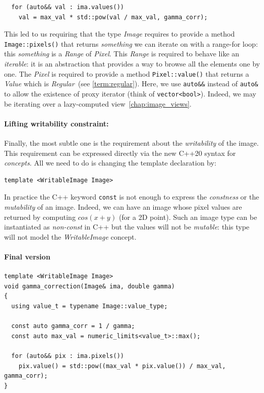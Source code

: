 \begin{verbatim}
  for (auto&& val : ima.values())
    val = max_val * std::pow(val / max_val, gamma_corr);
\end{verbatim}

\noindent This led to us requiring that the type \emph{Image} requires to provide a method \texttt{Image::pixels()} that
returns \emph{something} we can iterate on with a range-for loop: this \emph{something} is a \emph{Range} of
\emph{Pixel}. This \emph{Range} is required to behave like an \emph{iterable}: it is an abstraction that provides a way
to browse all the elements one by one. The \emph{Pixel} is required to provide a method \texttt{Pixel::value()} that
returns a \emph{Value} which is \emph{Regular}~(see \cref{term:regular}). Here, we use \texttt{auto\&\&} instead of
\texttt{auto\&} to allow the existence of proxy iterator (think of \texttt{vector<bool>}). Indeed, we may be iterating
over a lazy-computed view~\cref{chap:image_views}.



\paragraph{Lifting writability constraint:}
Finally, the most subtle one is the requirement about the \emph{writability} of the image. This requirement can be
expressed directly via the new C++20 syntax for \emph{concepts}. All we need to do is changing the template declaration
by:

\begin{verbatim}
template <WritableImage Image>
\end{verbatim}

\noindent In practice the C++ keyword \texttt{const} is not enough to express the \emph{constness} or the
\emph{mutability} of an image. Indeed, we can have an image whose pixel values are returned by computing $cos(x+y)$ (for
a 2D point). Such an image type can be instantiated as \emph{non-const} in C++ but the values will not be
\emph{mutable}: this type will not model the \emph{WritableImage} concept.



\paragraph{Final version}

\begin{verbatim}
template <WritableImage Image>
void gamma_correction(Image& ima, double gamma)
{
  using value_t = typename Image::value_type;

  const auto gamma_corr = 1 / gamma;
  const auto max_val = numeric_limits<value_t>::max();

  for (auto&& pix : ima.pixels())
    pix.value() = std::pow((max_val * pix.value()) / max_val, gamma_corr);
}
\end{verbatim}

